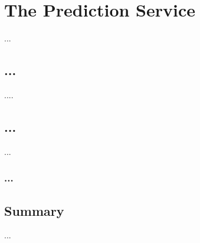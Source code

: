 \chapter{The Prediction Service}
\label{prediction-service}

...
\section{...}
....


\section{...}
...


\subsection{...}


\section{Summary}
...


